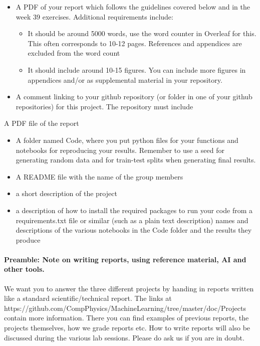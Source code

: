 \documentclass[%
oneside,                 %
final,                   %
10pt]{article}
\begin{document}
\begin{itemize}
\item A PDF of your report which follows the guidelines covered below and in the week 39 exercises. Additional requirements include:
\begin{itemize}

  \item It should be around 5000 words, use the word counter in Overleaf for this. This often corresponds to 10-12 pages. References and appendices are excluded from the word count

  \item It should include around 10-15 figures. You can include more figures in appendices and/or as supplemental material in your repository.

\end{itemize}

\noindent
\item A comment linking to your github repository (or folder in one of your github repositories) for this project. The repository must include
\end{itemize}

\noindent
A PDF file of the report
\begin{itemize}
  \item A folder named Code, where you put python files for your functions and notebooks for reproducing your results. Remember to use a seed for generating random data and for train-test splits when generating final results.

  \item A README file with the name of the group members

  \item a short description of the project

  \item a description of how to install the required packages to run your code from a requirements.txt file or similar (such as a plain text description) names and descriptions of the various notebooks in the Code folder and the results they produce
\end{itemize}

\noindent
\paragraph{Preamble: Note on writing reports, using reference material, AI and other tools.}
We want you to answer the three different projects by handing in
reports written like a standard scientific/technical report. The links
at
https://github.com/CompPhysics/MachineLearning/tree/master/doc/Projects
contain more information. There you can find examples of previous
reports, the projects themselves, how we grade reports etc. How to
write reports will also be discussed during the various lab
sessions. Please do ask us if you are in doubt.
\end{document}
